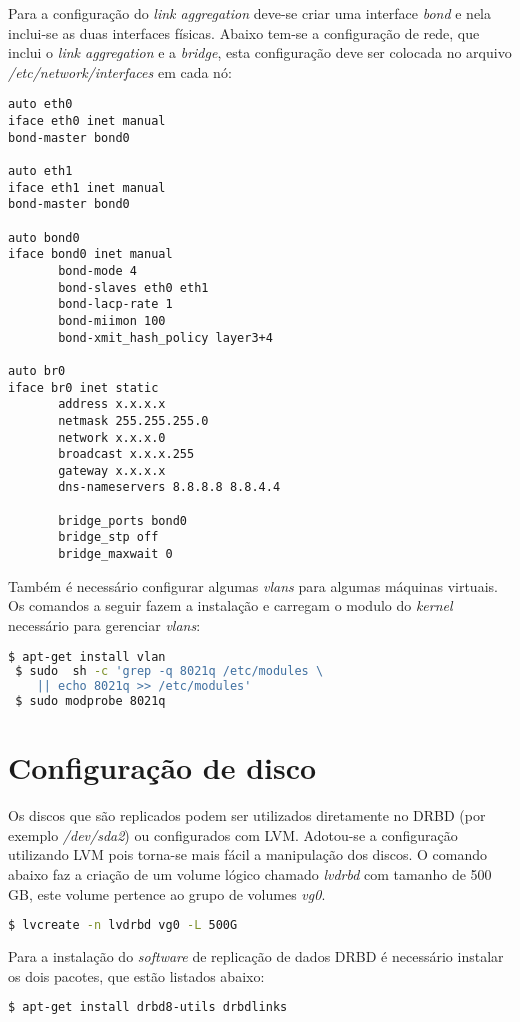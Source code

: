 Para a configuração do \textit{link aggregation} deve-se criar uma interface \textit{bond} e nela inclui-se as duas interfaces físicas.
Abaixo tem-se a configuração de rede, que inclui o \textit{link aggregation} e a \textit{bridge}, esta configuração deve ser colocada no 
arquivo \textit{/etc/network/interfaces} em cada nó:
\begin{lstlisting}
auto eth0
iface eth0 inet manual
bond-master bond0

auto eth1
iface eth1 inet manual
bond-master bond0

auto bond0
iface bond0 inet manual
       bond-mode 4
       bond-slaves eth0 eth1
       bond-lacp-rate 1
       bond-miimon 100
       bond-xmit_hash_policy layer3+4

auto br0
iface br0 inet static
       address x.x.x.x
       netmask 255.255.255.0
       network x.x.x.0
       broadcast x.x.x.255
       gateway x.x.x.x
       dns-nameservers 8.8.8.8 8.8.4.4
       
       bridge_ports bond0
       bridge_stp off
       bridge_maxwait 0
\end{lstlisting}

Também é necessário configurar algumas \textit{vlans} para algumas máquinas virtuais. Os comandos a seguir fazem a instalação e carregam
o modulo do \textit{kernel} necessário para gerenciar \textit{vlans}:
\begin{lstlisting}[language=bash]
 $ apt-get install vlan
 $ sudo  sh -c 'grep -q 8021q /etc/modules \
    || echo 8021q >> /etc/modules'
 $ sudo modprobe 8021q
\end{lstlisting}

\section{Configuração de disco}
\label{ap:confdisco}

Os discos que são replicados podem ser utilizados diretamente no \ac{DRBD} (por exemplo \textit{/dev/sda2}) ou configurados com \ac{LVM}. Adotou-se
a configuração utilizando \ac{LVM} pois torna-se mais fácil a manipulação dos discos. O comando abaixo faz a criação de um volume lógico chamado 
\textit{lvdrbd} com tamanho de 500 GB, este volume pertence ao grupo de volumes \textit{vg0}.
\begin{lstlisting}[language=bash]
 $ lvcreate -n lvdrbd vg0 -L 500G
\end{lstlisting}

Para a instalação do \textit{software} de replicação de dados \ac{DRBD} é necessário instalar os dois pacotes, que estão listados abaixo:
\begin{lstlisting}[language=bash]
 $ apt-get install drbd8-utils drbdlinks
\end{lstlisting}

